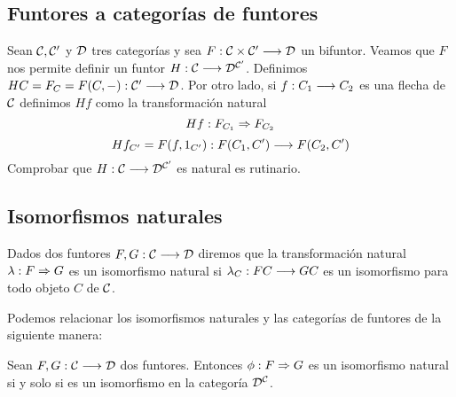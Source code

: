 \subsection{Funtores a categorías de funtores}
Sean $\mathcal{C}, \mathcal{C}'$ y $\mathcal{D}$ tres categorías y sea
$F: \mathcal{C}\times \mathcal{C}'\longrightarrow \mathcal{D}$ un bifuntor. Veamos que
$F$ nos permite definir
un funtor
$H: \mathcal{C}\longrightarrow \mathcal{D}^{\mathcal{C}'}$. Definimos
$HC = F_C = F(C, -) : \mathcal{C}'\longrightarrow \mathcal{D}$. Por otro lado,
si $f: C_1\longrightarrow C_2$ es una flecha de $\mathcal{C}$ definimos
$Hf$ como la transformación natural
$$Hf: F_{C_1}\Rightarrow F_{C_2}$$
$$Hf_{C'} = F(f, 1_{C'}): F(C_1, C')\longrightarrow F(C_2, C')$$
Comprobar que $H: \mathcal{C}\longrightarrow \mathcal{D}^{\mathcal{C}'}$ es natural
es rutinario.

\subsection{Isomorfismos naturales}
\begin{definition}
  Dados dos funtores $F, G : \mathcal{C}\longrightarrow \mathcal{D}$ diremos que la transformación
  natural $\lambda : F\Rightarrow G$ es un isomorfismo natural si
  $\lambda_C : FC\longrightarrow GC$ es un isomorfismo para todo objeto $C$
  de $\mathcal{C}$.
\end{definition}
Podemos relacionar los isomorfismos naturales y las categorías
de funtores de la siguiente manera:
\begin{proposition}
  Sean $F, G : \mathcal{C}\longrightarrow \mathcal{D}$ dos funtores. Entonces
  $\phi: F\Rightarrow G$
  es un isomorfismo natural si y solo si es un isomorfismo
  en la categoría $\mathcal{D}^{\mathcal{C}}$.
\end{proposition}
